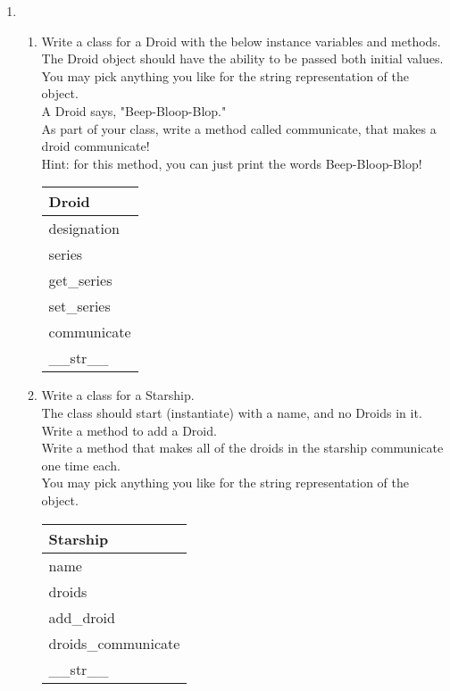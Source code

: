 \documentclass{article}
\begin{document}
\begin{enumerate}

	\item
	\begin{enumerate}
		\item
			Write a class for a Droid with the below instance variables and methods.\\ 
			The Droid object should have the ability to be passed both initial values.\\  
			You may pick anything you like for the string representation of the object.\\
			A Droid says, "Beep-Bloop-Blop."\\  
			As part of your class, write a method called communicate, that makes a droid communicate!\\
			Hint: for this method, you can just print the words Beep-Bloop-Blop!
			\begin{flushright}
			\begin{tabular}{|l|}
				\hline
				Droid\\ \hline
				designation\\	series\\	 \hline
				get\_series \\ set\_series \\ communicate \\ \_\_str\_\_ \\ \hline
			\end{tabular}
			\end{flushright}

		\item
			Write a class for a Starship. \\
			The class should start (instantiate) with a name, and no Droids in it. \\ 
			Write a method to add a Droid.\\
			Write a method that makes all of the droids in the starship communicate one time each.\\
			You may pick anything you like for the string representation of the object.
	
			\begin{flushright}
			\begin{tabular}{|l|}
				\hline
				Starship\\ \hline  	%
				name\\ droids\\ \hline		%
				add\_droid\\ droids\_communicate \\ \_\_str\_\_ \\ \hline		%
			\end{tabular}
			\end{flushright}


\end{enumerate}
\end{enumerate}
\end{document}
